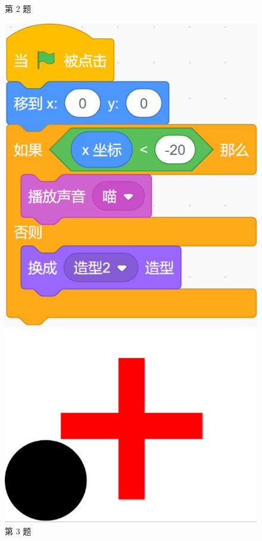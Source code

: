 \documentclass[10pt, a4paper]{article}
\begin{document}
\begin{enumerate}
\begin{figure}[htbp]
\begin{minipage}[t]{.11\textwidth}
                \caption*{第 2 题}
            \end{minipage}
            \begin{minipage}[t]{.2\textwidth}
                \centering
                \includegraphics[width=\textwidth]{3.png}
                \caption*{第 3 题}
            \end{minipage}
            \begin{minipage}[t]{.32\textwidth}
                \centering
                \begin{minipage}[t]{.4\textwidth}
                    \includegraphics[width=\textwidth]{4-1.png}

\end{minipage}
\end{minipage}
\end{figure}
\end{enumerate}
\end{document}

